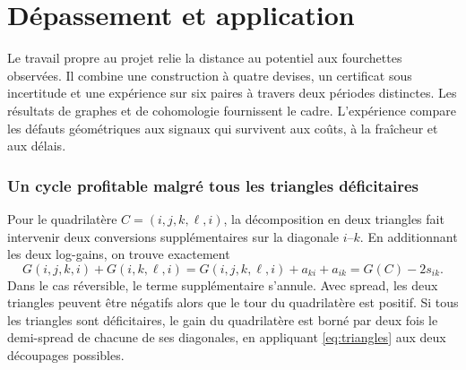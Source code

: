 \documentclass[11pt,a4paper]{article}
\theoremstyle{clair}
\begin{document}
\clearpage
\part{Dépassement et application}
\label{part:dep}
Le travail propre au projet relie la distance au potentiel aux fourchettes observées. Il combine une construction à quatre devises, un certificat sous incertitude et une expérience sur six paires à travers deux périodes distinctes. Les résultats de graphes et de cohomologie fournissent le cadre. L'expérience compare les défauts géométriques aux signaux qui survivent aux coûts, à la fraîcheur et aux délais.

\section{Un cycle profitable malgré tous les triangles déficitaires}
\label{sec:contrex}

Pour le quadrilatère $C=(i,j,k,\ell,i)$, la décomposition en deux triangles fait intervenir deux conversions supplémentaires sur la diagonale $i$--$k$. En additionnant les deux log-gains, on trouve exactement
\begin{equation}
 G(i,j,k,i)+G(i,k,\ell,i)
 =G(i,j,k,\ell,i)+a_{ki}+a_{ik}
 =G(C)-2s_{ik}.
 \label{eq:triangles}
\end{equation}
Dans le cas réversible, le terme supplémentaire s'annule. Avec spread, les deux triangles peuvent être négatifs alors que le tour du quadrilatère est positif. Si tous les triangles sont déficitaires, le gain du quadrilatère est borné par deux fois le demi-spread de chacune de ses diagonales, en appliquant \eqref{eq:triangles} aux deux découpages possibles.
\end{document}
